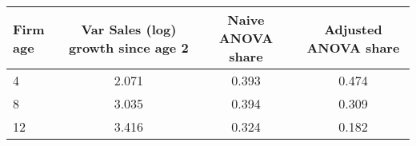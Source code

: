 \begin{tabular}{lccc}
Firm age & Var Sales (log) growth since age 2 & Naive ANOVA share & Adjusted ANOVA share \\
\hline
4 &     2.071 &  0.393 &  0.474 \\
8 &     3.035 &  0.394 &  0.309 \\
12 &     3.416 &  0.324 &  0.182 \\
\end{tabular}

